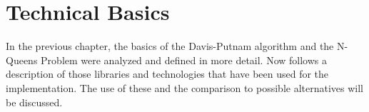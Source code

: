 

\chapter{Technical Basics}
\label{ch:tecBasics}
In the previous chapter, the basics of the Davis-Putnam algorithm and the N-Queens Problem were analyzed and defined in more detail. Now follows a description of those libraries and technologies that have been used for the implementation. The use of these and the comparison to possible alternatives will be discussed. 

